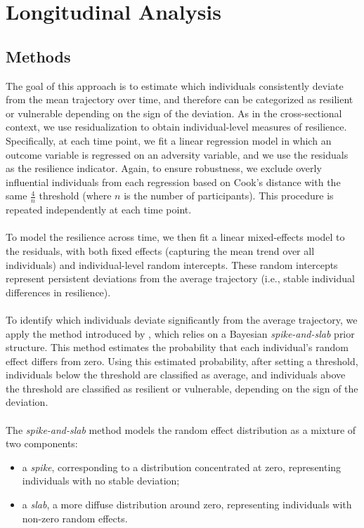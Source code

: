 \documentclass[12pt]{article}
\begin{document}
\section{Longitudinal Analysis}
\subsection{Methods}
The goal of this approach is to estimate which individuals consistently deviate from the mean trajectory over time, and therefore can be categorized as resilient or vulnerable depending on the sign of the deviation. As in the cross-sectional context, we use residualization to obtain individual-level measures of resilience. Specifically, at each time point, we fit a linear regression model in which an outcome variable is regressed on an adversity variable, and we use the residuals as the resilience indicator. Again, to ensure robustness, we exclude overly influential individuals from each regression based on Cook’s distance with the same $\frac{4}{n}$ threshold (where $n$ is the number of participants). This procedure is repeated independently at each time point.\\
\\
To model the resilience across time, we then fit a linear mixed-effects model to the residuals, with both fixed effects (capturing the mean trend over all individuals) and individual-level random intercepts. These random intercepts represent persistent deviations from the average trajectory (i.e., stable individual differences in resilience).\\
\\
To identify which individuals deviate significantly from the average trajectory, we apply the method introduced by \cite{spike_and_slab}, which relies on a Bayesian \textit{spike-and-slab} prior structure. This method estimates the probability that each individual's random effect differs from zero. Using this estimated probability, after setting a threshold, individuals below the threshold are classified as average, and individuals above the threshold are classified as resilient or vulnerable, depending on the sign of the deviation.\\
\\
The \textit{spike-and-slab} method models the random effect distribution as a mixture of two components:
\begin{itemize}
  \item a \textit{spike}, corresponding to a distribution concentrated at zero, representing individuals with no stable deviation;
  \item a \textit{slab}, a more diffuse distribution around zero, representing individuals with non-zero random effects.
\end{itemize}
\end{document}
